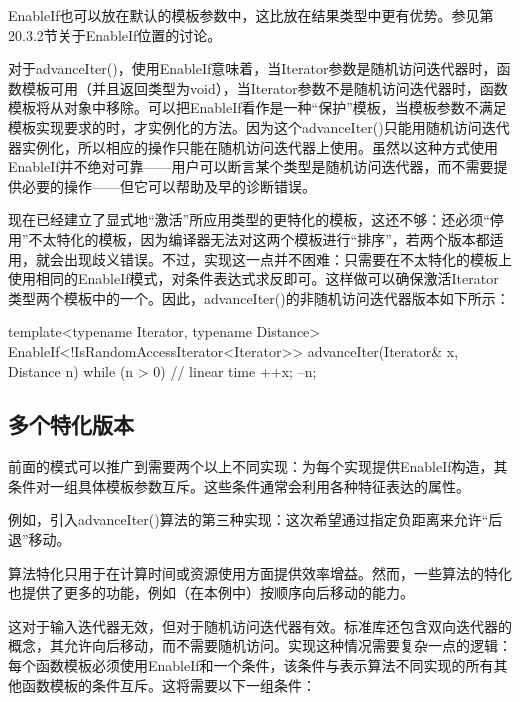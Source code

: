\begin{notice}
EnableIf也可以放在默认的模板参数中，这比放在结果类型中更有优势。参见第20.3.2节关于EnableIf位置的讨论。
\end{notice}

对于advanceIter()，使用EnableIf意味着，当Iterator参数是随机访问迭代器时，函数模板可用（并且返回类型为void），当Iterator参数不是随机访问迭代器时，函数模板将从对象中移除。可以把EnableIf看作是一种“保护”模板，当模板参数不满足模板实现要求的时，才实例化的方法。因为这个advanceIter()只能用随机访问迭代器实例化，所以相应的操作只能在随机访问迭代器上使用。虽然以这种方式使用EnableIf并不绝对可靠——用户可以断言某个类型是随机访问迭代器，而不需要提供必要的操作——但它可以帮助及早的诊断错误。

现在已经建立了显式地“激活”所应用类型的更特化的模板，这还不够：还必须“停用”不太特化的模板，因为编译器无法对这两个模板进行“排序”，若两个版本都适用，就会出现歧义错误。不过，实现这一点并不困难：只需要在不太特化的模板上使用相同的EnableIf模式，对条件表达式求反即可。这样做可以确保激活Iterator类型两个模板中的一个。因此，advanceIter()的非随机访问迭代器版本如下所示：

\begin{cpp}
template<typename Iterator, typename Distance>
EnableIf<!IsRandomAccessIterator<Iterator>>
advanceIter(Iterator& x, Distance n) {
	while (n > 0) { // linear time
		++x;
		--n;
	}
}
\end{cpp}

\subsection{多个特化版本}

前面的模式可以推广到需要两个以上不同实现：为每个实现提供EnableIf构造，其条件对一组具体模板参数互斥。这些条件通常会利用各种特征表达的属性。

例如，引入advanceIter()算法的第三种实现：这次希望通过指定负距离来允许“后退”移动。

\begin{notice}
算法特化只用于在计算时间或资源使用方面提供效率增益。然而，一些算法的特化也提供了更多的功能，例如（在本例中）按顺序向后移动的能力。
\end{notice}

这对于输入迭代器无效，但对于随机访问迭代器有效。标准库还包含双向迭代器的概念，其允许向后移动，而不需要随机访问。实现这种情况需要复杂一点的逻辑：每个函数模板必须使用EnableIf和一个条件，该条件与表示算法不同实现的所有其他函数模板的条件互斥。这将需要以下一组条件：

